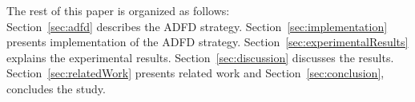 \documentclass{acm_proc_article-sp}
\begin{document}
The rest of this paper is organized as follows: \\ Section~\ref{sec:adfd} describes the ADFD strategy. Section~\ref{sec:implementation} presents implementation of the ADFD strategy. Section~\ref{sec:experimentalResults} explains the experimental results. Section~\ref{sec:discussion} discusses the results. Section~\ref{sec:relatedWork} presents related work and Section~\ref{sec:conclusion}, concludes the study.



\end{document}
